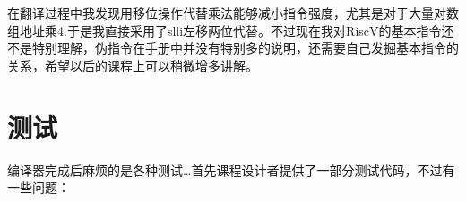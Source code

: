 \documentclass{ctexart}
\begin{document}
%

在翻译过程中我发现用移位操作代替乘法能够减小指令强度，尤其是对于大量对数组地址乘4.于是我直接采用了slli左移两位代替。不过现在我对RiscV的基本指令还不是特别理解，伪指令在手册中并没有特别多的说明，还需要自己发掘基本指令的关系，希望以后的课程上可以稍微增多讲解。

\section{测试}

编译器完成后麻烦的是各种测试…首先课程设计者提供了一部分测试代码，不过有一些问题：
\end{document}
